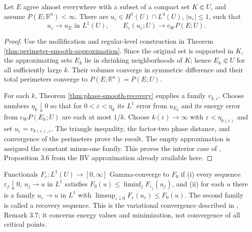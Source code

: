 \begin{theorem}\label{thm:phase-interior-recovery}
Let $E$ agree almost everywhere with a subset of a compact set $K\Subset U$, and assume $P(E;\mathbb R^n)<\infty$. There are $u_\varepsilon\in H^1(U)\cap L^4(U)$, $|u_\varepsilon|\leq1$, such that
\[
 u_\varepsilon\to u_E\text{ in }L^1(U),\qquad
 E_\varepsilon(u_\varepsilon;U)\to c_WP(E;U).
\]
\end{theorem}
\begin{proof}
Use the mollification and regular-level construction in Theorem \ref{thm:perimeter-smooth-approximation}. Since the original set is supported in $K$, the approximating sets $E_k$ lie in shrinking neighborhoods of $K$; hence $E_k\Subset U$ for all sufficiently large $k$. Their volumes converge in symmetric difference and their total perimeters converge to $P(E;\mathbb R^n)=P(E;U)$.

For each $k$, Theorem \ref{thm:phase-smooth-recovery} supplies a family $v_{k,\varepsilon}$. Choose numbers $\eta_k\downarrow0$ so that for $0<\varepsilon<\eta_k$ its $L^1$ error from $u_{E_k}$ and its energy error from $c_WP(E_k;U)$ are each at most $1/k$. Choose $k(\varepsilon)\to\infty$ with $\varepsilon<\eta_{k(\varepsilon)}$ and set $u_\varepsilon=v_{k(\varepsilon),\varepsilon}$. The triangle inequality, the factor-two phase distance, and convergence of the perimeters prove the result. The empty approximation is assigned the constant minus-one family. This proves the interior case of \cite{ChAC}, Proposition 3.6 from the BV approximation already available here.
\end{proof}

\begin{definition}\label{def:phase-gamma-convergence}
Functionals $F_\varepsilon:L^1(U)\to[0,\infty]$ Gamma-converge to $F_0$ if (i) every sequence $\varepsilon_j\downarrow0$, $u_j\to u$ in $L^1$ satisfies $F_0(u)\leq\liminf_jF_{\varepsilon_j}(u_j)$, and (ii) for each $u$ there is a family $u_\varepsilon\to u$ in $L^1$ with $\limsup_{\varepsilon\downarrow0}F_\varepsilon(u_\varepsilon)\leq F_0(u)$. The second family is called a recovery sequence. This is the variational convergence described in \cite{ChAC}, Remark 3.7; it concerns energy values and minimization, not convergence of all critical points.
\end{definition}

